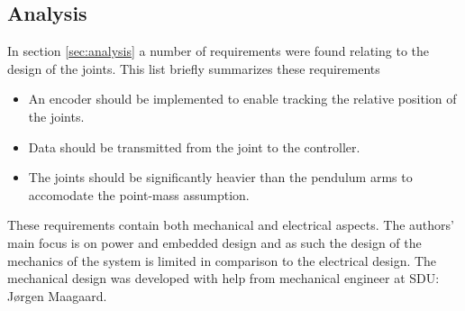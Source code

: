 \subsection{Analysis} %
\label{sub:analysis}

In section \ref{sec:analysis} a number of requirements were found relating to the design of the joints.
This list briefly summarizes these requirements

\begin{itemize}
	\item An encoder should be implemented to enable tracking the relative position of the joints.
	\item Data should be transmitted from the joint to the controller.
	\item The joints should be significantly heavier than the pendulum arms to accomodate the point-mass assumption. 
\end{itemize}

These requirements contain both mechanical and electrical aspects.
The authors' main focus is on power and embedded design and as such the design of the mechanics of the system is limited in comparison to the electrical design.
The mechanical design was developed with help from mechanical engineer at SDU: Jørgen Maagaard.

